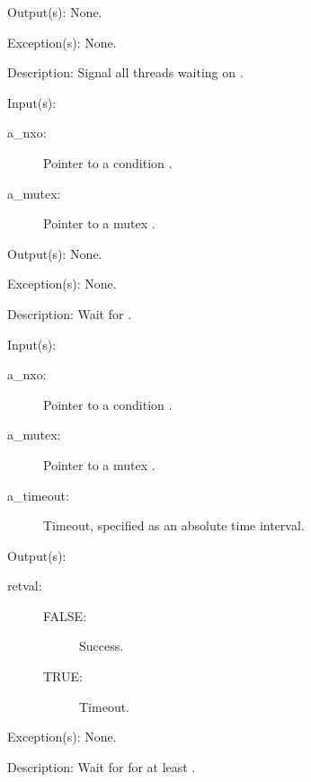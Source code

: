 \begin{capi}
\begin{capilist}
	\item[Output(s): ] None.
	\item[Exception(s): ] None.
	\item[Description: ]
		Signal all threads waiting on .
	\end{capilist}
\label{nxo_condition_wait}
	\begin{capilist}
	\item[Input(s): ]
		\begin{description}\item[]
		\item[a\_nxo: ]
			Pointer to a condition .
		\item[a\_mutex: ]
			Pointer to a mutex .
		\end{description}
	\item[Output(s): ] None.
	\item[Exception(s): ] None.
	\item[Description: ]
		Wait for .
	\end{capilist}
\label{nxo_condition_timedwait}
	\begin{capilist}
	\item[Input(s): ]
		\begin{description}\item[]
		\item[a\_nxo: ]
			Pointer to a condition \classname{nxo}.
		\item[a\_mutex: ]
			Pointer to a mutex \classname{nxo}.
		\item[a\_timeout: ]
			Timeout, specified as an absolute time interval.
		\end{description}
	\item[Output(s): ]
		\begin{description}\item[]
		\item[retval: ]
			\begin{description}\item[]
			\item[FALSE: ] Success.
			\item[TRUE: ] Timeout.
			\end{description}
		\end{description}
	\item[Exception(s): ] None.
	\item[Description: ]
		Wait for  for at least \cvar{a\_timeout}.
	\end{capilist}
\end{capi}
